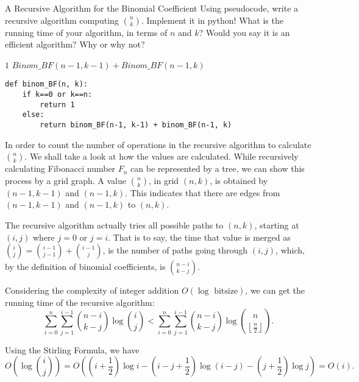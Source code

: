 \documentclass[UTF8, a4paper, linespread=1.5]{article}
\begin{document}
\newpage
\begin{thm}{A Recursive Algorithm for the Binomial Coefficient}{}
   Using pseudocode, write a recursive algorithm computing
  ${n \choose k}$. Implement it in python! What is 
  the running time of your algorithm, in terms of $n$ and $k$? Would you say it is an efficient
  algorithm? Why or why not?
\end{thm}

\begin{algorithm}
    \caption{Binom\_BF: A Recursive Algorithm for the Binomial Coefficient.}
    \begin{algorithmic}
        \RETURN $1$
        \ELSE
        \RETURN $Binom\_BF(n-1, k-1) + Binom\_BF(n-1, k)$
        \ENDIF
    \end{algorithmic}
\end{algorithm}

\begin{verbatim}
def binom_BF(n, k):
    if k==0 or k==n:
        return 1
    else:
        return binom_BF(n-1, k-1) + binom_BF(n-1, k)
\end{verbatim}

In order to count the number of operations in the recursive algorithm to calculate $\displaystyle \binom n k$. We shall take a look at how the values are calculated. While recursively calculating Fibonacci number $F_n$ can be represented by a tree, we can show this process by a grid graph. A value $\displaystyle \binom n k$, in grid $(n, k)$, is obtained by $(n-1, k-1)$ and $(n-1, k)$. This indicates that there are edges from $(n-1, k-1)$ and $(n-1, k)$ to $(n, k)$.

The recursive algorithm actually tries all possible paths to $(n, k)$, starting at $(i, j)$ where $j = 0$ or $j = i$. That is to say, the time that value is merged as $\displaystyle \binom i j = \binom {i-1}{j-1} + \binom {i-1} j$, is the number of paths going through $(i, j)$, which, by the definition of binomial coefficients, is $\displaystyle \binom {n-i}{k-j}$.

Considering the complexity of integer addition $O(\log \text{ bitsize})$, we can get the running time of the recursive algorithm: $$\sum_{i=0}^n\sum_{j=1}^{i-1} \binom {n-i}{k-j} \log  \binom i j < \sum_{i=0}^n\sum_{j=1}^{i-1} \binom {n-i}{k-j} \log  \binom n {\left\lfloor \frac{n}{2} \right\rfloor }.$$

Using the Stirling Formula, we have
$$O( \log \binom i j) = O((i+\frac{1}{2})\log i-(i-j+\frac{1}{2})\log (i-j)-(j+\frac{1}{2})\log j) = O(i).$$
\end{document}

